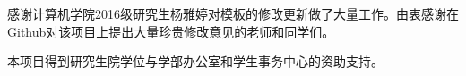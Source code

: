 

\begin{thanks}


感谢计算机学院2016级研究生杨雅婷对模板的修改更新做了大量工作。由衷感谢在Github对该项目上提出大量珍贵修改意见的老师和同学们。

本项目得到研究生院学位与学部办公室和学生事务中心的资助支持。

\end{thanks}
